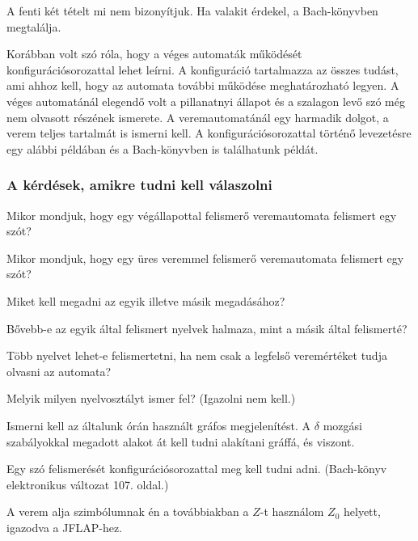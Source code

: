 \documentclass[a4paper]{article}
\begin{document}
A fenti két tételt mi nem bizonyítjuk. Ha valakit érdekel, a
Bach-könyvben megtalálja.

Korábban volt szó róla, hogy a véges automaták működését
konfigurációsorozattal lehet leírni. A konfiguráció tartalmazza az
összes tudást, ami ahhoz kell, hogy az automata további működése
meghatározható legyen.  A véges automatánál elegendő volt a pillanatnyi
állapot és a szalagon levő szó még nem olvasott részének ismerete. A
veremautomatánál egy harmadik dolgot, a verem teljes tartalmát is
ismerni kell. A konfigurációsorozattal történő levezetésre egy alábbi
példában és a Bach-könyvben is találhatunk példát.

\subsubsection{A kérdések, amikre tudni kell válaszolni}

Mikor mondjuk, hogy egy végállapottal felismerő veremautomata
felismert egy szót?

Mikor mondjuk, hogy egy üres veremmel felismerő veremautomata
felismert egy szót?

Miket kell megadni az egyik illetve másik megadásához?

Bővebb-e az egyik által felismert nyelvek halmaza, mint a másik által
felismerté?

Több nyelvet lehet-e felismertetni, ha nem csak a legfelső veremértéket
tudja olvasni az automata?

Melyik milyen nyelvosztályt ismer fel? (Igazolni nem kell.)


Ismerni kell az általunk órán használt gráfos megjelenítést.
A $\delta$ mozgási szabályokkal megadott alakot át kell tudni
alakítani gráffá, és viszont.

Egy szó felismerését konfigurációsorozattal meg kell tudni adni.
(Bach-könyv elektronikus változat 107. oldal.)

A verem alja szimbólumnak én a továbbiakban a $Z$-t használom $Z_0$ helyett,
igazodva a JFLAP-hez.
\end{document}
